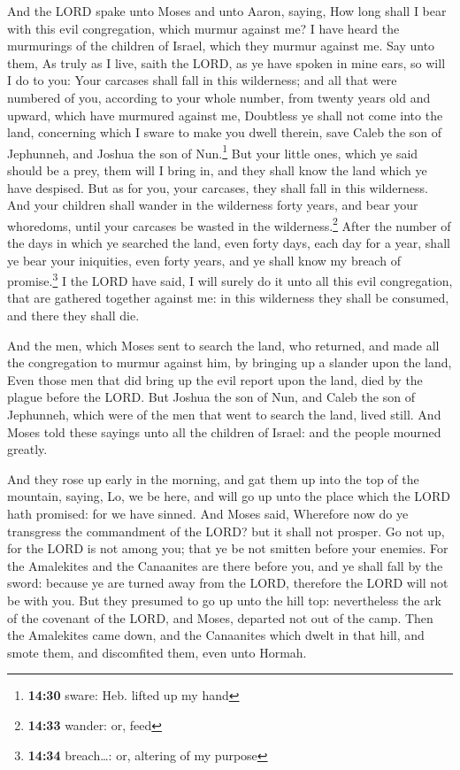  And the LORD spake unto Moses and unto Aaron, saying,
 How long shall I bear with this evil congregation, which
murmur against me? I have heard the murmurings of the children of
Israel, which they murmur against me.  Say unto them, As
truly as I live, saith the LORD, as ye have spoken in mine ears, so will
I do to you:  Your carcases shall fall in this
wilderness; and all that were numbered of you, according to your whole
number, from twenty years old and upward, which have murmured against
me,  Doubtless ye shall not come into the land,
concerning which I sware to make you dwell therein, save Caleb the son
of Jephunneh, and Joshua the son of Nun.\footnote{\textbf{14:30} sware:
  Heb. lifted up my hand}  But your little ones, which ye
said should be a prey, them will I bring in, and they shall know the
land which ye have despised.  But as for you, your
carcases, they shall fall in this wilderness.  And your
children shall wander in the wilderness forty years, and bear your
whoredoms, until your carcases be wasted in the wilderness.\footnote{\textbf{14:33}
  wander: or, feed}  After the number of the days in
which ye searched the land, even forty days, each day for a year, shall
ye bear your iniquities, even forty years, and ye shall know my breach
of promise.\footnote{\textbf{14:34} breach\ldots: or, altering of my
  purpose}  I the LORD have said, I will surely do it
unto all this evil congregation, that are gathered together against me:
in this wilderness they shall be consumed, and there they shall die.

 And the men, which Moses sent to search the land, who
returned, and made all the congregation to murmur against him, by
bringing up a slander upon the land,  Even those men that
did bring up the evil report upon the land, died by the plague before
the LORD.  But Joshua the son of Nun, and Caleb the son
of Jephunneh, which were of the men that went to search the land, lived
still.  And Moses told these sayings unto all the
children of Israel: and the people mourned greatly.

 And they rose up early in the morning, and gat them up
into the top of the mountain, saying, Lo, we be here, and will go up
unto the place which the LORD hath promised: for we have sinned.
 And Moses said, Wherefore now do ye transgress the
commandment of the LORD? but it shall not prosper.  Go
not up, for the LORD is not among you; that ye be not smitten before
your enemies.  For the Amalekites and the Canaanites are
there before you, and ye shall fall by the sword: because ye are turned
away from the LORD, therefore the LORD will not be with you.
 But they presumed to go up unto the hill top:
nevertheless the ark of the covenant of the LORD, and Moses, departed
not out of the camp.  Then the Amalekites came down, and
the Canaanites which dwelt in that hill, and smote them, and discomfited
them, even unto Hormah.

